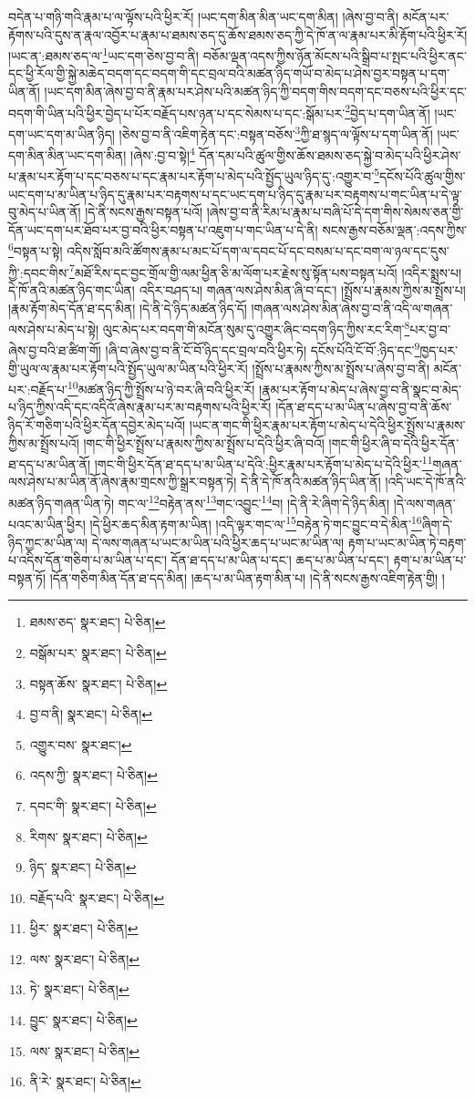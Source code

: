 བདེན་པ་གཉི་གའི་རྣམ་པ་ལ་ལྟོས་པའི་ཕྱིར་རོ། །ཡང་དག་མིན་མིན་ཡང་དག་མིན། །ཞེས་བྱ་བ་ནི། མངོན་པར་རྟོགས་པའི་དུས་ན་རྣལ་འབྱོར་པ་རྣམ་པ་ཐམས་ཅད་དུ་ཆོས་ཐམས་ཅད་ཀྱི་དེ་ཁོ་ན་ལ་རྣམ་པར་མི་རྟོག་པའི་ཕྱིར་རོ། །ཡང་ན་:ཐམས་ཅད་ལ་\footnote{ཐམས་ཅད་  སྣར་ཐང་།  པེ་ཅིན། }ཡང་དག་ཅེས་བྱ་བ་ནི། བཅོམ་ལྡན་འདས་ཀྱིས་ཉོན་མོངས་པའི་སྒྲིབ་པ་སྤང་པའི་ཕྱིར་ནང་དང་ཕྱི་རོལ་གྱི་སྐྱེ་མཆེད་བདག་དང་བདག་གི་དང་བྲལ་བའི་མཚན་ཉིད་གཡོ་བ་མེད་པ་ཤེས་བྱར་བསྟན་པ་དག་ཡིན་ནོ། །ཡང་དག་མིན་ཞེས་བྱ་བ་ནི་རྣམ་པར་ཤེས་པའི་མཚན་ཉིད་ཀྱི་བདག་གིས་བདག་དང་བཅས་པའི་ཕྱིར་དང་བདག་གི་ཡིན་པའི་ཕྱིར་བྱེད་པ་པོར་བརྗོད་པས་ཉན་པ་དང་སེམས་པ་དང་:སྒོམ་པར་\footnote{བསྒོམ་པར་  སྣར་ཐང་།  པེ་ཅིན། }བྱེད་པ་དག་ཡིན་ནོ། །ཡང་དག་ཡང་དག་མ་ཡིན་ཉིད། །ཅེས་བྱ་བ་ནི་འཇིག་རྟེན་དང་:བསྟན་བཅོས་\footnote{བསྟན་ཆོས་  སྣར་ཐང་།  པེ་ཅིན། }ཀྱི་ཐ་སྙད་ལ་ལྟོས་པ་དག་ཡིན་ནོ། །ཡང་དག་མིན་མིན་ཡང་དག་མིན། །ཞེས་:བྱ་བ་སྟེ།\footnote{བྱ་བ་ནི།  སྣར་ཐང་།  པེ་ཅིན། } དོན་དམ་པའི་ཚུལ་གྱིས་ཆོས་ཐམས་ཅད་སྐྱེ་བ་མེད་པའི་ཕྱིར་ཤེས་པ་རྣམ་པར་རྟོག་པ་དང་བཅས་པ་དང་རྣམ་པར་རྟོག་པ་མེད་པའི་སྤྱོད་ཡུལ་ཉིད་དུ་:འགྱུར་བ་\footnote{འགྱུར་བས་  སྣར་ཐང་། }དངོས་པོའི་ཚུལ་གྱིས་ཡང་དག་པ་མ་ཡིན་པ་ཉིད་དུ་རྣམ་པར་བརྟགས་པ་དང་ཡང་དག་པ་ཉིད་དུ་རྣམ་པར་བརྟགས་པ་གང་ཡིན་པ་དེ་ལྟ་བུ་མེད་པ་ཡིན་ནོ། །དེ་ནི་སངས་རྒྱས་བསྟན་པའོ། །ཞེས་བྱ་བ་ནི་རིམ་པ་རྣམ་པ་བཞི་པོ་དེ་དག་གིས་སེམས་ཅན་གྱི་དོན་ཡང་དག་པར་ཐོབ་པར་བྱ་བའི་ཕྱིར་བསྟན་པ་འཇུག་པ་གང་ཡིན་པ་དེ་ནི། སངས་རྒྱས་བཅོམ་ལྡན་:འདས་ཀྱིས་\footnote{འདས་ཀྱི་  སྣར་ཐང་།  པེ་ཅིན། }བསྟན་པ་སྟེ། འདིས་སློབ་མའི་ཚོགས་རྣམ་པ་མང་པོ་དག་ལ་དབང་པོ་དང་བསམ་པ་དང་བག་ལ་ཉལ་དང་དུས་ཀྱི་:དབང་གིས་\footnote{དབང་གི་  སྣར་ཐང་།  པེ་ཅིན། }མཐོ་རིས་དང་བྱང་གྲོལ་གྱི་ལམ་ཕྱིན་ཅི་མ་ལོག་པར་རྗེས་སུ་སྟོན་པས་བསྟན་པའོ། །འདིར་སྨྲས་པ། དེ་ཁོ་ནའི་མཚན་ཉིད་གང་ཡིན། འདིར་བཤད་པ། གཞན་ལས་ཤེས་མིན་ཞི་བ་དང་། །སྤྲོས་པ་རྣམས་ཀྱིས་མ་སྤྲོས་པ། །རྣམ་རྟོག་མེད་དོན་ཐ་དད་མིན། །དེ་ནི་དེ་ཉིད་མཚན་ཉིད་དོ། །གཞན་ལས་ཤེས་མིན་ཞེས་བྱ་བ་ནི་འདི་ལ་གཞན་ལས་ཤེས་པ་མེད་པ་སྟེ། ལུང་མེད་པར་བདག་གི་མངོན་སུམ་དུ་འགྱུར་ཞིང་བདག་ཉིད་ཀྱིས་རང་རིག་\footnote{རིགས་  སྣར་ཐང་།  པེ་ཅིན། }པར་བྱ་བ་ཞེས་བྱ་བའི་ཐ་ཚིག་གོ། །ཞི་བ་ཞེས་བྱ་བ་ནི་ངོ་བོ་ཉིད་དང་བྲལ་བའི་ཕྱིར་ཏེ། དངོས་པོའི་ངོ་བོ་:ཉིད་དང་\footnote{ཉིད་  སྣར་ཐང་།  པེ་ཅིན། }ཁྱད་པར་གྱི་ཡུལ་ལ་རྣམ་པར་རྟོག་པའི་སྤྱོད་ཡུལ་མ་ཡིན་པའི་ཕྱིར་རོ། །སྤྲོས་པ་རྣམས་ཀྱིས་མ་སྤྲོས་པ་ཞེས་བྱ་བ་ནི། མངོན་པར་:བརྗོད་པ་\footnote{བརྗོད་པའི་  སྣར་ཐང་།  པེ་ཅིན། }མཚན་ཉིད་ཀྱི་སྤྲོས་པ་ཉེ་བར་ཞི་བའི་ཕྱིར་རོ། །རྣམ་པར་རྟོག་པ་མེད་པ་ཞེས་བྱ་བ་ནི་སྣང་བ་མེད་པ་ཉིད་ཀྱིས་འདི་དང་འདིའོ་ཞེས་རྣམ་པར་མ་བརྟགས་པའི་ཕྱིར་རོ། །དོན་ཐ་དད་པ་མ་ཡིན་པ་ཞེས་བྱ་བ་ནི་ཆོས་ཉིད་རོ་གཅིག་པའི་ཕྱིར་དོན་དབྱེར་མེད་པའོ། །ཡང་ན་གང་གི་ཕྱིར་རྣམ་པར་རྟོག་པ་མེད་པ་དེའི་ཕྱིར་སྤྲོས་པ་རྣམས་ཀྱིས་མ་སྤྲོས་པའོ། །གང་གི་ཕྱིར་སྤྲོས་པ་རྣམས་ཀྱིས་མ་སྤྲོས་པ་དེའི་ཕྱིར་ཞི་བའོ། །གང་གི་ཕྱིར་ཞི་བ་དེའི་ཕྱིར་དོན་ཐ་དད་པ་མ་ཡིན་ནོ། །གང་གི་ཕྱིར་དོན་ཐ་དད་པ་མ་ཡིན་པ་དེའི་:ཕྱིར་རྣམ་པར་རྟོག་པ་མེད་པ་དེའི་ཕྱིར་\footnote{ཕྱིར་  སྣར་ཐང་།  པེ་ཅིན། }གཞན་ལས་ཤེས་པ་མ་ཡིན་ནོ་ཞེས་རྣམ་གྲངས་ཀྱི་སྒྲར་བསྟན་ཏེ། དེ་ནི་དེ་ཁོ་ནའི་མཚན་ཉིད་ཡིན་ནོ། །འདི་ཡང་དེ་ཁོ་ནའི་མཚན་ཉིད་གཞན་ཡིན་ཏེ། གང་ལ་\footnote{ལས་  སྣར་ཐང་།  པེ་ཅིན། }བརྟེན་ནས་\footnote{ཏེ་  སྣར་ཐང་།  པེ་ཅིན། }གང་འབྱུང་\footnote{བྱུང་  སྣར་ཐང་།  པེ་ཅིན། }བ། །དེ་ནི་རེ་ཞིག་དེ་ཉིད་མིན། །དེ་ལས་གཞན་པའང་མ་ཡིན་ཕྱིར། །དེ་ཕྱིར་ཆད་མིན་རྟག་མ་ཡིན། །འདི་ལྟར་གང་ལ་\footnote{ལས་  སྣར་ཐང་།  པེ་ཅིན། }བརྟེན་ཏེ་གང་བྱུང་བ་དེ་མིན་\footnote{ནི་རེ་  སྣར་ཐང་།  པེ་ཅིན། }ཞིག་དེ་ཉིད་ཀྱང་མ་ཡིན་ལ། དེ་ལས་གཞན་པ་ཡང་མ་ཡིན་པའི་ཕྱིར་ཆད་པ་ཡང་མ་ཡིན་ལ། རྟག་པ་ཡང་མ་ཡིན་ཏེ་བརྟག་པ་འདིས་དོན་གཅིག་པ་མ་ཡིན་པ་དང་། དོན་ཐ་དད་པ་མ་ཡིན་པ་དང་། ཆད་པ་མ་ཡིན་པ་དང་། རྟག་པ་མ་ཡིན་པ་བསྟན་ཏོ། །དོན་གཅིག་མིན་དོན་ཐ་དད་མིན། །ཆད་པ་མ་ཡིན་རྟག་མིན་པ། །དེ་ནི་སངས་རྒྱས་འཇིག་རྟེན་གྱི། །
